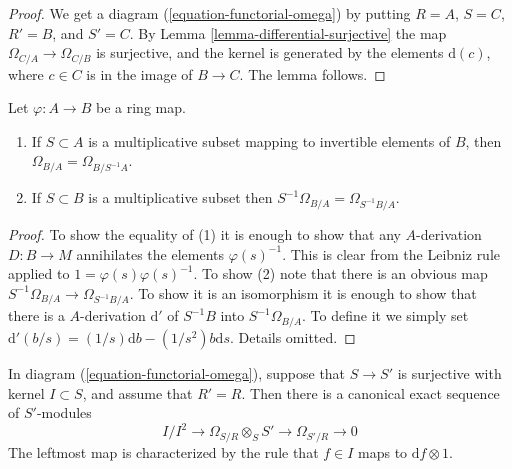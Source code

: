 \begin{proof}
We get a diagram (\ref{equation-functorial-omega}) by putting
$R = A$, $S = C$, $R' = B$, and $S' = C$.
By Lemma \ref{lemma-differential-surjective} the map
$\Omega_{C/A} \to \Omega_{C/B}$ is surjective, and the kernel
is generated by the elements $\text{d}(c)$, where $c \in C$
is in the image of $B \to C$. The lemma follows.
\end{proof}

\begin{lemma}
\label{lemma-differentials-localize}
Let $\varphi : A \to B$ be a ring map.
\begin{enumerate}
\item If $S \subset A$ is a multiplicative subset mapping to
invertible elements of $B$, then $\Omega_{B/A} = \Omega_{B/S^{-1}A}$.
\item If $S \subset B$ is a multiplicative subset then
$S^{-1}\Omega_{B/A} = \Omega_{S^{-1}B/A}$.
\end{enumerate}
\end{lemma}

\begin{proof}
To show the equality of (1) it is enough to show that any
$A$-derivation $D : B \to M$ annihilates the elements $\varphi(s)^{-1}$.
This is clear from the Leibniz rule applied to
$1 = \varphi(s) \varphi(s)^{-1}$.
To show (2) note that there is an obvious map
$S^{-1}\Omega_{B/A} \to \Omega_{S^{-1}B/A}$.
To show it is an isomorphism it is enough to show that
there is a $A$-derivation $\text{d}'$ of $S^{-1}B$ into $S^{-1}\Omega_{B/A}$.
To define it we simply set
$\text{d}'(b/s) = (1/s)\text{d}b - (1/s^2)b\text{d}s$.
Details omitted.
\end{proof}

\begin{lemma}
\label{lemma-differential-seq}
In diagram (\ref{equation-functorial-omega}),
suppose that $S \to S'$ is surjective with kernel $I \subset S$,
and assume that $R' = R$.
Then there is a canonical exact sequence of $S'$-modules
$$
I/I^2
\longrightarrow
\Omega_{S/R}\otimes_S S'
\longrightarrow
\Omega_{S'/R}
\longrightarrow
0
$$
The leftmost map is characterized by the rule that
$f \in I$ maps to $\text{d}f \otimes 1$.
\end{lemma}

